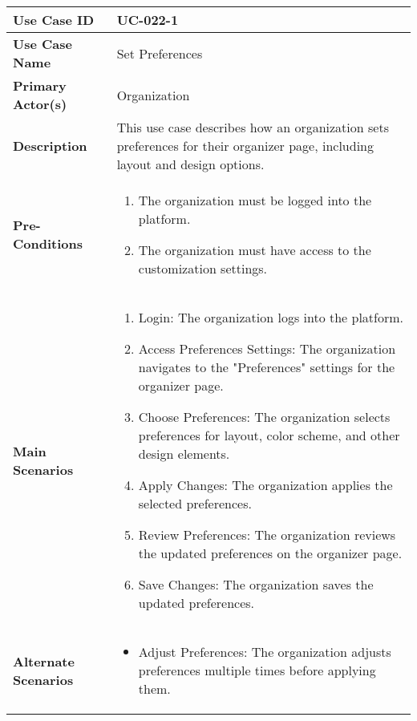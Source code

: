 \begin{table}[!ht]
    \centering
    \renewcommand{\arraystretch}{1.3} %
    \begin{tabularx}{\textwidth}{|l|X|}
        \hline
        \textbf{Use Case ID} & UC-022-1 \\
        \hline
        \textbf{Use Case Name} & Set Preferences \\
        \hline
        \textbf{Primary Actor(s)} & Organization \\
        \hline
        \textbf{Description} & This use case describes how an organization sets preferences for their organizer page, including layout and design options. \\
        \hline
        \textbf{Pre-Conditions} & 
        \begin{enumerate}[label=\arabic*.,itemsep=0pt]
            \item The organization must be logged into the platform.
            \item The organization must have access to the customization settings.
        \end{enumerate} \\
        \hline
        \textbf{Main Scenarios} & 
        \begin{enumerate}[label=\arabic*.,itemsep=0pt]
            \item Login: The organization logs into the platform.
            \item Access Preferences Settings: The organization navigates to the "Preferences" settings for the organizer page.
            \item Choose Preferences: The organization selects preferences for layout, color scheme, and other design elements.
            \item Apply Changes: The organization applies the selected preferences.
            \item Review Preferences: The organization reviews the updated preferences on the organizer page.
            \item Save Changes: The organization saves the updated preferences.
        \end{enumerate} \\
        \hline
        \textbf{Alternate Scenarios} & 
        \begin{itemize}[label=--,itemsep=0pt]
            \item Adjust Preferences: The organization adjusts preferences multiple times before applying them.

\end{itemize}
\end{tabularx}
\end{table}
